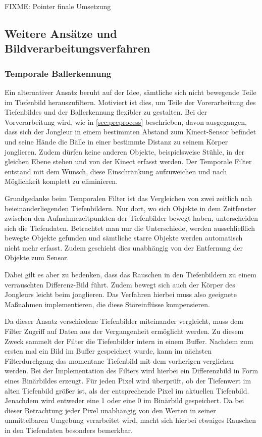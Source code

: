 \documentclass[12pt,a4paper,ngerman]{scrartcl}
\begin{document}
FIXME: Pointer finale Umsetzung

\subsection{Weitere Ansätze und Bildverarbeitungsverfahren}

\subsubsection{Temporale Ballerkennung}
\label{sec:temporal}

Ein alternativer Ansatz beruht auf der Idee, sämtliche sich nicht bewegende Teile im Tiefenbild herauszufiltern. Motiviert ist dies, um Teile der Vorerarbeitung des Tiefenbildes und der Ballerkennung flexibler zu gestalten. Bei der Vorverarbeitung wird, wie in \ref{sec:preprocess} beschrieben, davon ausgegangen, dass sich der Jongleur in einem bestimmten Abstand zum Kinect-Sensor befindet und seine Hände  die Bälle in einer bestimmte Distanz zu seinem Körper jonglieren. Zudem dürfen keine anderen Objekte,
beispielsweise Stühle, in der gleichen Ebene stehen und von der Kinect erfasst werden.
Der Temporale Filter entstand mit dem Wunsch, diese Einschränkung aufzuweichen und nach Möglichkeit komplett zu eliminieren.

Grundgedanke beim Temporalen Filter ist das Vergleichen von zwei zeitlich nah beieinanderliegenden Tiefenbildern.
Nur dort, wo sich Objekte in dem Zeitfenster zwischen den Aufnahmezeitpunkten der Tiefenbilder bewegt haben,
unterscheiden sich die Tiefendaten. Betrachtet man nur die Unterschiede, werden ausschließlich bewegte Objekte gefunden und sämtliche starre Objekte werden automatisch nicht mehr erfasst.
Zudem geschieht dies unabhängig von der Entfernung der Objekte zum Sensor.

Dabei gilt es aber zu bedenken, dass das Rauschen in den Tiefenbildern zu einem verrauschten Differenz-Bild führt. Zudem bewegt sich auch der Körper des Jongleurs leicht beim jonglieren. Das Verfahren hierbei muss also geeignete Maßnahmen implementieren, die diese Störeinflüsse kompensieren.

Da dieser Ansatz verschiedene Tiefenbilder miteinander vergleicht, muss dem Filter Zugriff auf Daten aus der Vergangenheit ermöglicht werden.
Zu diesem Zweck sammelt der Filter die Tiefenbilder intern in einem Buffer.
Nachdem zum ersten mal ein Bild im Buffer gespeichert wurde, kann im nächsten Filterdurchgang das momentane Tiefenbild mit dem vorherigen verglichen werden.
Bei der Implementation des Filters wird hierbei ein Differenzbild in Form eines Binärbildes erzeugt.
Für jeden Pixel wird überprüft, ob der Tiefenwert im alten Tiefenbild größer ist, als der entsprechende Pixel im aktuellen Tiefenbild.
Jenachdem wird entweder eine 1 oder eine 0 im Binärbild gespeichert.
Da bei dieser Betrachtung jeder Pixel unabhängig von den Werten in seiner unmittelbaren Umgebung verarbeitet wird, macht sich hierbei etwaiges Rauschen in den Tiefendaten besonders bemerkbar.
\end{document}
